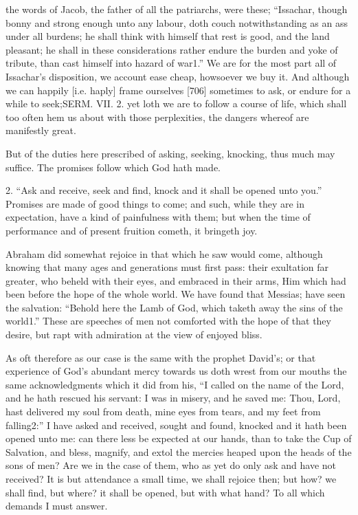 the words of Jacob, the father of all the patriarchs, were these; “Issachar, though bonny and strong enough unto any labour, doth couch notwithstanding as an ass under all burdens; he shall think with himself that rest is good, and the land pleasant; he shall in these considerations rather endure the burden and yoke of tribute, than cast himself into hazard of war1.” We are for the most part all of Issachar’s disposition, we account ease cheap, howsoever we buy it. And although we can happily [i.e. haply] frame ourselves [706] sometimes to ask, or endure for a while to seek;SERM. VII. 2. yet loth we are to follow a course of life, which shall too often hem us about with those perplexities, the dangers whereof are manifestly great.

But of the duties here prescribed of asking, seeking, knocking, thus much may suffice. The promises follow which God hath made.

2. “Ask and receive, seek and find, knock and it shall be opened unto you.” Promises are made of good things to come; and such, while they are in expectation, have a kind of painfulness with them; but when the time of performance and of present fruition cometh, it bringeth joy.

Abraham did somewhat rejoice in that which he saw would come, although knowing that many ages and generations must first pass: their exultation far greater, who beheld with their eyes, and embraced in their arms, Him which had been before the hope of the whole world. We have found that Messias; have seen the salvation: “Behold here the Lamb of God, which taketh away the sins of the world1.” These are speeches of men not comforted with the hope of that they desire, but rapt with admiration at the view of enjoyed bliss.

As oft therefore as our case is the same with the prophet David’s; or that experience of God’s abundant mercy towards us doth wrest from our mouths the same acknowledgments which it did from his, “I called on the name of the Lord, and he hath rescued his servant: I was in misery, and he saved me: Thou, Lord, hast delivered my soul from death, mine eyes from tears, and my feet from falling2:” I have asked and received, sought and found, knocked and it hath been opened unto me: can there less be expected at our hands, than to take the Cup of Salvation, and bless, magnify, and extol the mercies heaped upon the heads of the sons of men? Are we in the case of them, who as yet do only ask and have not received? It is but attendance a small time, we shall rejoice then; but how? we shall find, but where? it shall be opened, but with what hand? To all which demands I must answer.

